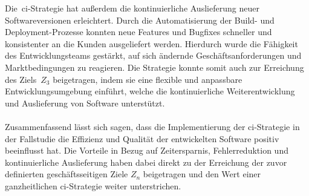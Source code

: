 Die\ \acrshort{ci}-Strategie hat außerdem die kontinuierliche Auslieferung neuer Softwareversionen erleichtert.
Durch die Automatisierung der Build- und Deployment-Prozesse konnten neue Features und Bugfixes schneller und
konsistenter an die Kunden ausgeliefert werden.
Hierdurch wurde die Fähigkeit des Entwicklungsteams gestärkt, auf sich ändernde Geschäftsanforderungen und
Marktbedingungen zu reagieren.
Die Strategie konnte somit auch zur Erreichung des Ziels\ \hyperlink{project-goals}{$Z_3$} beigetragen, indem sie eine
flexible und anpassbare Entwicklungsumgebung einführt, welche die kontinuierliche Weiterentwicklung und Auslieferung
von Software unterstützt.
\\\\
Zusammenfassend lässt sich sagen, dass die Implementierung der \acrshort{ci}-Strategie in der Fallstudie die
Effizienz und Qualität der entwickelten Software positiv beeinflusst hat.
Die Vorteile in Bezug auf Zeitersparnis, Fehlerreduktion und kontinuierliche Auslieferung haben dabei direkt zu der
Erreichung der zuvor definierten geschäftsseitigen Ziele $Z_n$ beigetragen und den Wert einer ganzheitlichen
\acrshort{ci}-Strategie weiter unterstrichen.

\clearpage
